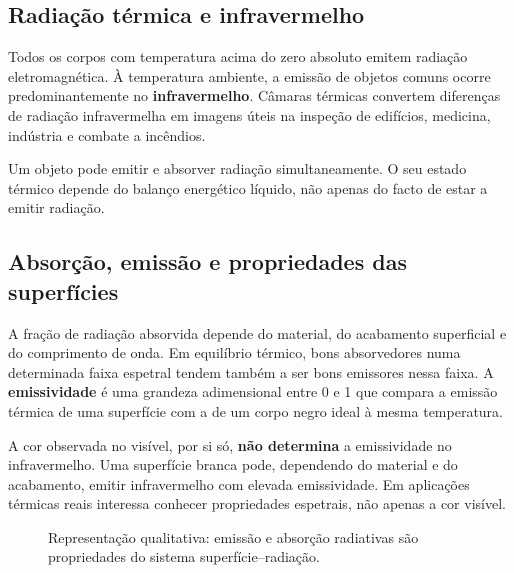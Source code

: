 \documentclass[11pt,a4paper,oneside]{book}
\begin{document}
\subsection*{Radiação térmica e infravermelho}
Todos os corpos com temperatura acima do zero absoluto emitem radiação eletromagnética. À temperatura ambiente, a emissão de objetos comuns ocorre predominantemente no \textbf{infravermelho}. Câmaras térmicas convertem diferenças de radiação infravermelha em imagens úteis na inspeção de edifícios, medicina, indústria e combate a incêndios.

\begin{sabias}
Um objeto pode emitir e absorver radiação simultaneamente. O seu estado térmico depende do balanço energético líquido, não apenas do facto de estar a emitir radiação.
\end{sabias}


\subsection*{Absorção, emissão e propriedades das superfícies}
A fração de radiação absorvida depende do material, do acabamento superficial e do comprimento de onda. Em equilíbrio térmico, bons absorvedores numa determinada faixa espetral tendem também a ser bons emissores nessa faixa. A \textbf{emissividade} é uma grandeza adimensional entre 0 e 1 que compara a emissão térmica de uma superfície com a de um corpo negro ideal à mesma temperatura.

\begin{nota}
A cor observada no visível, por si só, \textbf{não determina} a emissividade no infravermelho. Uma superfície branca pode, dependendo do material e do acabamento, emitir infravermelho com elevada emissividade. Em aplicações térmicas reais interessa conhecer propriedades espetrais, não apenas a cor visível.
\end{nota}

\begin{figure}[H]
\centering
{}
\caption{Representação qualitativa: emissão e absorção radiativas são propriedades do sistema superfície--radiação.}
\end{figure}
\end{document}
